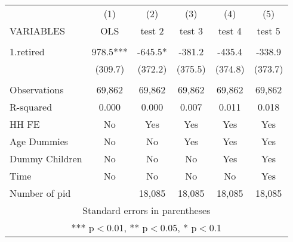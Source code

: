 \begin{tabular}{lccccc} \hline
 & (1) & (2) & (3) & (4) & (5) \\
VARIABLES & OLS & test 2 & test 3 & test 4 & test 5 \\ \hline
 &  &  &  &  &  \\
1.retired & 978.5*** & -645.5* & -381.2 & -435.4 & -338.9 \\
 & (309.7) & (372.2) & (375.5) & (374.8) & (373.7) \\
 &  &  &  &  &  \\
Observations & 69,862 & 69,862 & 69,862 & 69,862 & 69,862 \\
R-squared & 0.000 & 0.000 & 0.007 & 0.011 & 0.018 \\
HH FE & No & Yes & Yes & Yes & Yes \\
Age Dummies & No & No & Yes & Yes & Yes \\
Dummy Children & No & No & No & Yes & Yes \\
Time & No & No & No & No & Yes \\
 Number of pid &  & 18,085 & 18,085 & 18,085 & 18,085 \\ \hline
\multicolumn{6}{c}{ Standard errors in parentheses} \\
\multicolumn{6}{c}{ *** p$<$0.01, ** p$<$0.05, * p$<$0.1} \\
\end{tabular}

